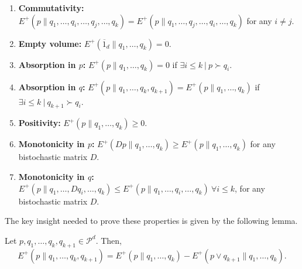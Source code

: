 \begin{enumerate}
    \item \textbf{Commutativity:} $E^+(p \parallel q_1, \dots, q_i, \dots, q_j, \dots, q_k) = E^+(p \parallel q_1, \dots, q_j, \dots, q_i, \dots, q_k)$ for any $i \neq j$. \label{prop:commutativity}
    \item \textbf{Empty volume:} $E^+(\overline{1}_d \parallel q_1, \dots, q_k) = 0$. \label{prop:empty}
    \item \textbf{Absorption in $p$:} $E^+(p \parallel q_1, \dots, q_k) = 0$ if $\exists i \leq k \: | \: p \succ q_i$. \label{prop:p_absorption}
    \item \textbf{Absorption in $q$:} $E^+(p \parallel q_1, \dots, q_k, q_{k+1}) = E^+(p \parallel q_1, \dots, q_k)$ if $\exists i \leq k \: | \: q_{k+1} \succ q_i$. \label{prop:q_absorption}
    \item \textbf{Positivity:} $E^+(p \parallel q_1, \dots, q_k) \geq 0$. \label{prop:positivity}
    \item \textbf{Monotonicity in $p$:} $E^+(Dp \parallel q_1, \dots, q_k) \geq E^+(p \parallel q_1, \dots, q_k)$ for any bistochastic matrix $D$. \label{prop:p_monotonicity}
    \item \textbf{Monotonicity in $q$:} $E^+(p \parallel q_1, \dots, Dq_i, \dots, q_k) \leq E^+(p \parallel q_1, \dots, q_i, \dots, q_k) \: \forall i \leq k$,  for any bistochastic matrix $D$. \label{prop:q_monotonicity}
\end{enumerate}

\noindent The key insight needed to prove these properties is given by the following lemma.

\begin{lemma} \label{lem:induction_trick}
    Let $p, q_1, \dots, q_k, q_{k+1} \in \mathcal{P}^d$. Then,
    \begin{equation}
        E^+(p \parallel q_1, \dots, q_k, q_{k+1}) = E^+(p \parallel q_1, \dots, q_k) - E^+(p \vee q_{k+1} \parallel q_1, \dots, q_k).
    \end{equation}
\end{lemma}

